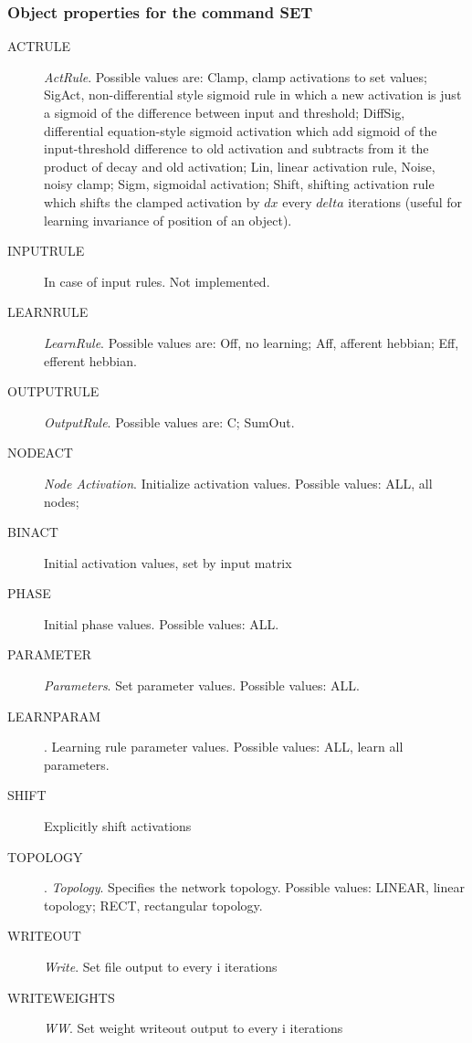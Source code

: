 \documentclass[12pt]{article}
\begin{document}
\subsubsection{Object properties for the command SET}
\begin{description}
  \item[ACTRULE] {\em ActRule}. Possible values are: Clamp, clamp
  activations to set values; SigAct, non-differential style sigmoid
  rule in which a new activation is just a sigmoid of the difference
  between input and threshold; 
  DiffSig, differential equation-style sigmoid activation which add
  sigmoid of the input-threshold difference to old activation and 
  subtracts from it the product of decay and old activation;
  Lin, linear activation rule, Noise, noisy clamp; Sigm, sigmoidal
  activation; Shift, shifting activation rule which shifts the clamped
  activation by $dx$ every $delta$ iterations (useful for learning
  invariance of position of an object). 
  \item[INPUTRULE] In case of input rules. Not implemented.
  \item[LEARNRULE] {\em LearnRule}. Possible values are: Off, no learning;
  Aff, afferent hebbian; Eff, efferent hebbian. 
  \item[OUTPUTRULE] {\em OutputRule}. Possible values are: C; SumOut.
  \item[NODEACT] {\em Node Activation}. Initialize activation
  values. Possible values: ALL, all nodes; 
  \item[BINACT] Initial activation values, set by input matrix
  \item[PHASE] Initial phase values. Possible values: ALL.
  \item[PARAMETER] {\em Parameters}. Set parameter values. Possible
  values: ALL.
  \item[LEARNPARAM]. Learning rule parameter values. Possible values:
  ALL, learn all parameters.
  \item[SHIFT] Explicitly shift activations
  \item[TOPOLOGY]. {\em Topology}. Specifies the network
  topology. Possible values: LINEAR, linear topology; RECT,
  rectangular topology. 
  \item[WRITEOUT] {\em Write}. Set file output to every i iterations 
  \item[WRITEWEIGHTS] {\em WW}. Set weight writeout output to every i 
  iterations
\end{description}
\end{document}

